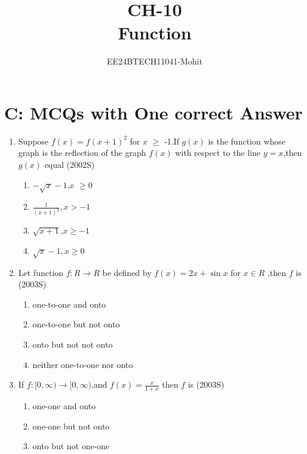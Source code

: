 \documentclass[journal,12pt,twocolumn]{IEEEtran}
\theoremstyle{remark}
\begin{document}

\vspace{3cm}

\title{CH-10\\ Function}
\author{EE24BTECH11041-Mohit}
\maketitle
\newpage
\bigskip

\renewcommand{\thefigure}{\theenumi}
\renewcommand{\thetable}{\theenumi}

\section {C: MCQs with One correct Answer}
\begin{enumerate}
\item Suppose $f(x)=f(x+1)^2 $ for $x$ $\geq$ -1.If $g(x)$ is the   function whose graph is the reflection of the graph $f(x)$ with respect to the line $y=x$,then $g(x)$ equal
\hfill(2002S)\\
\begin{multicols}{2}
\begin{enumerate}
    \item $-\sqrt{x}-1$,$x$ $\geq$0
    \item $\frac{1}{(x+1)^2},x>-1$
    \item $\sqrt{x+1}$,$x\geq-1$
    \item $\sqrt{x} -1,x\geq 0$
\end{enumerate}
\end{multicols}
\item Let function $f:R\rightarrow R$ be defined by $f(x)=2x + \sin x$ for $x\in R$ ,then $f$ is
\hfill(2003S)\\
\begin{enumerate}
    \item one-to-one and onto
    \item one-to-one but not onto
    \item onto but not not onto
    \item neither one-to-one nor onto
\end{enumerate}
\item If $f:[0,\infty) \rightarrow [0,\infty)$,and $f(x)=\frac{x}{1+x}$ then $f$ is
\hfill(2003S)\\
\begin{enumerate}
    \item one-one and onto
    \item one-one but not onto
    \item onto but not one-one

\end{enumerate}
\end{enumerate}
\end{document}
